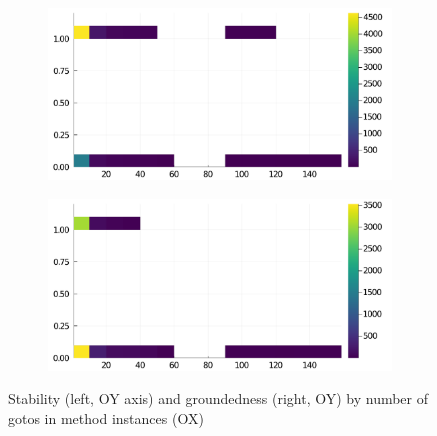 \begin{figure}[h]
     \begin{subfigure}[b]{0.49\textwidth}
       \includegraphics[width=\textwidth]{figs/all-package-graphs/DifferentialEquations-gotos-vs-stable.pdf}
     \end{subfigure}
     \begin{subfigure}[b]{0.49\textwidth}
       \includegraphics[width=\textwidth]{figs/all-package-graphs/DifferentialEquations-gotos-vs-grounded.pdf}
     \end{subfigure}
\caption{Stability (left, OY axis) and groundedness (right, OY) by number of gotos in method instances (OX)}%
%
\label{figs:gotos:DifferentialEquations}
\end{figure}

